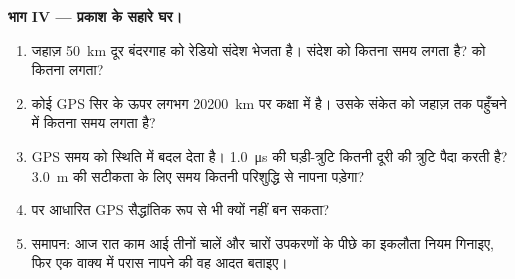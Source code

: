 \begin{problem}[{सप्ताहांत समस्या --- दुनिया के संकेत पढ़ना: एक ही नियम,
$d = v\,t$, जो तूफ़ान की दूरी नापता है, समुद्र-तल का नक्शा बनाता है, धड़कनें
गिनता है और GPS का भेद भी खोल देता है}]
\medskip
\noindent\textbf{भाग IV --- प्रकाश के सहारे घर।}
\begin{enumerate}[resume]
  \item जहाज़ \qty{50}{km} दूर बंदरगाह को रेडियो संदेश भेजता है। संदेश को
        कितना समय लगता है?  को कितना लगता?
  \item कोई GPS  सिर के ऊपर लगभग \qty{20200}{km} पर
        कक्षा में है। उसके संकेत को जहाज़ तक पहुँचने
        में कितना समय लगता है?
  \item GPS समय को स्थिति में बदल देता है। \qty{1.0}{\micro s} की घड़ी-त्रुटि कितनी
        दूरी की त्रुटि पैदा करती है? \qty{3.0}{m} की सटीकता के लिए समय कितनी
        परिशुद्धि से नापना पड़ेगा?
  \item {} पर आधारित GPS सैद्धांतिक रूप से भी क्यों नहीं बन सकता?
  \item समापन: आज रात काम आई तीनों चालें और चारों उपकरणों के पीछे का
        इकलौता नियम गिनाइए, फिर एक वाक्य में परास नापने की वह आदत बताइए।
\end{enumerate}
\end{problem}
